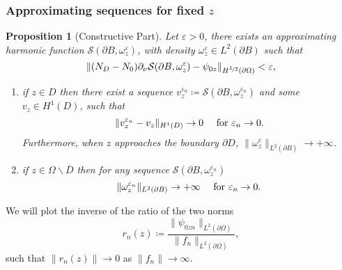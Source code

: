 \documentclass[10pt,xcolor={dvipsnames}]{beamer}
\newtheorem{proposition}[subsection]{Proposition}
\theoremstyle{plain}
\theoremstyle{plain}
\let\epsilon\varepsilon
\begin{document}
\begin{frame}
 \frametitle{Approximating sequences for fixed $z$}
\begin{proposition}[Constructive Part]
\footnotesize
\label{prop:lsm-constructive}
Let $\epsilon > 0$, there exists an {\color{blue}approximating harmonic function} $\mathcal{S}(\partial B, \omega^\epsilon_z)$, with density $\omega^\epsilon_z\in L^2(\partial B)$  such that
\begin{equation}
 \|({N_D} - {N_0})\partial_\nu\mathcal{S}(\partial B, \omega^\epsilon_z) - \psi_{0z}\|_{H^{\nicefrac{1}{2}}(\partial\Omega)} < \epsilon,
\end{equation}
\begin{enumerate}
 \item if {\color{blue}$z \in D$}  
  then there exist a sequence 
 $v^{\epsilon_n}_z\coloneqq\mathcal{S}(\partial B, \omega^{\epsilon_n}_z)$ 
 and some
 $ v_z\in H^1(D)$, such that
  \begin{equation}
 \|v^{\epsilon_n}_z - v_z\|_{H^1(D)} \to 0\quad\textup{ for }\epsilon_n \to 0.
  \end{equation}
  Furthermore, when $z$ approaches the boundary $\partial D$, $\|\omega^\epsilon_z\|_{L^2(\partial B)}\to + \infty$.
 \item if {\color{blue}$z \in \Omega\backslash\overline{D}$} then for any 
 sequence $\mathcal{S}(\partial B, \omega^{\epsilon_n}_z)$
\begin{equation}
\|\omega^{\epsilon_n}_z\|_{L^2(\partial B)}\to + \infty\quad\textup{ for }\epsilon_n \to 0.
\end{equation}
\end{enumerate}
\end{proposition}
\footnotesize
We will plot the inverse of the ratio of the two norms
\begin{equation}
 r_n(z)\coloneqq\frac{\|\psi_{0zn}\|_{L^2(\partial \Omega)}}{\|f_n\|_{L^2(\partial \Omega)}},
\end{equation}
such that $\|r_n(z)\|\to 0$ as $\|f_n\|\to \infty$.


\end{frame}
\end{document}
